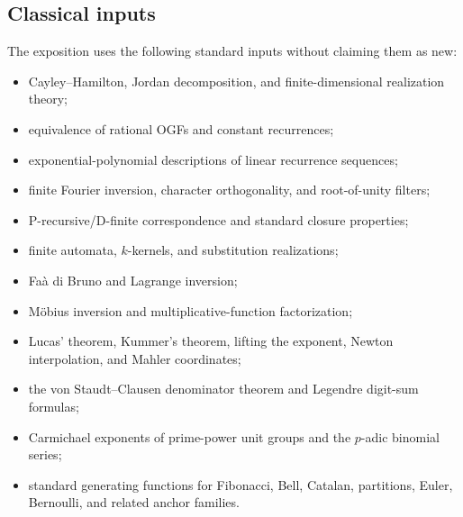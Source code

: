 \documentclass[11pt]{article}
\theoremstyle{definition}\newtheorem{definition}[theorem]{Definition}\newtheorem{example}[theorem]{Example}\newtheorem{construction}[theorem]{Construction}\newtheorem{algorithm}[theorem]{Algorithm}\newtheorem{conjecture}[theorem]{Conjecture}\newtheorem{problem}[theorem]{Problem}
\theoremstyle{remark}\newtheorem{remark}[theorem]{Remark}\newtheorem{boundary}[theorem]{Boundary}\newtheorem{certificate}[theorem]{Computational Certificate}\newtheorem{classical}[theorem]{Classical Input}\newtheorem{principle}[theorem]{Structural Principle}
\begin{document}
\subsection{Classical inputs}
The exposition uses the following standard inputs without claiming them as new:
\begin{itemize}
\item Cayley--Hamilton, Jordan decomposition, and finite-dimensional realization theory;
\item equivalence of rational OGFs and constant recurrences;
\item exponential-polynomial descriptions of linear recurrence sequences;
\item finite Fourier inversion, character orthogonality, and root-of-unity filters;
\item P-recursive/D-finite correspondence and standard closure properties;
\item finite automata, $k$-kernels, and substitution realizations;
\item Fa\`a di Bruno and Lagrange inversion;
\item M\"obius inversion and multiplicative-function factorization;
\item Lucas' theorem, Kummer's theorem, lifting the exponent, Newton interpolation, and Mahler coordinates;
\item the von Staudt--Clausen denominator theorem and Legendre digit-sum formulas;
\item Carmichael exponents of prime-power unit groups and the $p$-adic binomial series;
\item standard generating functions for Fibonacci, Bell, Catalan, partitions, Euler, Bernoulli, and related anchor families.
\end{itemize}
\end{document}
